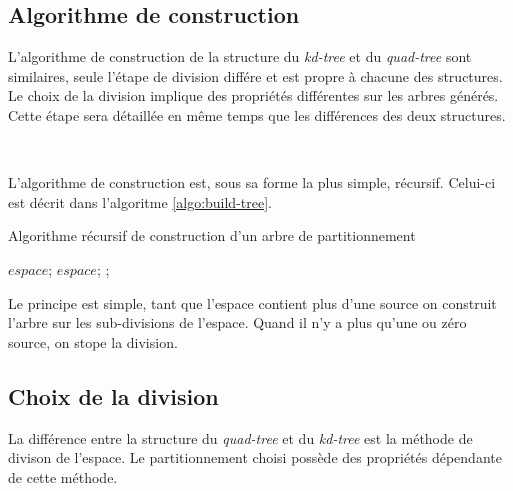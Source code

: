 	\subsection{Algorithme de construction}

L'algorithme de construction de la structure du \emph{kd-tree} et du \emph{quad-tree} sont similaires, seule l'étape de division différe et est propre à chacune des structures. Le choix de la division implique des propriétés différentes sur les arbres générés. Cette étape sera détaillée en même temps que les différences des deux structures.

\

L'algorithme de construction est, sous sa forme la plus simple, récursif. Celui-ci est décrit dans l'algoritme \ref{algo:build-tree}.

	\begin{algorithm}
		\caption{Algorithme récursif de construction d'un arbre de partitionnement}
		\label{algo:build-tree}
		\begin{algorithmic}[1]
					\State \Return $espace$;
					\State \Return $espace$;
				\Else
					\State \Return {};
				\EndIf
			\EndFunction
		\end{algorithmic}
	\end{algorithm}

Le principe est simple, tant que l'espace contient plus d'une source on construit l'arbre sur les sub-divisions de l'espace. Quand il n'y a plus qu'une ou zéro source, on stope la division.


	\subsection{Choix de la division}

La différence entre la structure du \emph{quad-tree} et du \emph{kd-tree} est la méthode de divison de l'espace. Le partitionnement choisi possède des propriétés dépendante de cette méthode.

